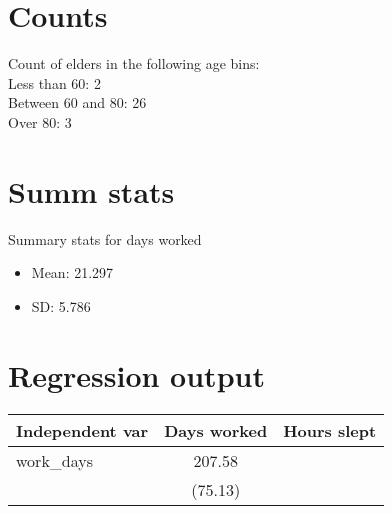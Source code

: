 \documentclass[12pt]{article}
\begin{document}
\section{Counts}
Count of elders in the following age bins:\\ 
Less than 60: 2 \\
Between 60 and 80: 26 \\
Over 80: 3 \\

\section{Summ stats}
Summary stats for days worked
\begin{itemize}
\item Mean: 21.297
\item SD: 5.786
\end{itemize}

\section{Regression output}
\begin{tabular}{lcc}
\hline
 \hline
 Independent var  &  Days worked & Hours slept \\
\hline
work_days & 207.58 &\\
& (75.13) &\\
\hline
\hline
\end{tabular}
\end{document}

